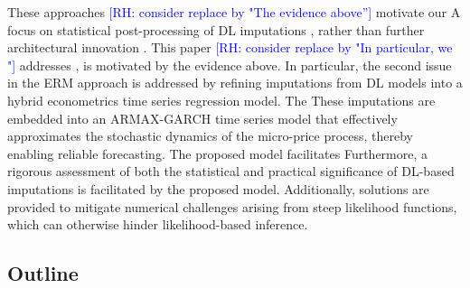 \documentclass[10pt,a4paper,oneside]{article}
\newcommand{\rh}[1]{\textcolor{blue}{\textsf{[RH: #1]}}}
\providecommand{\DIFaddtex}[1]{{\protect\color{blue} \sf #1}} %
\providecommand{\DIFdeltex}[1]{{\protect\color{red} \scriptsize #1}} %
\providecommand{\DIFaddbegin}{} %
\providecommand{\DIFaddend}{} %
\providecommand{\DIFdelbegin}{} %
\providecommand{\DIFdelend}{} %
\providecommand{\DIFadd}[1]{\texorpdfstring{\DIFaddtex{#1}}{#1}} %
\providecommand{\DIFdel}[1]{\texorpdfstring{\DIFdeltex{#1}}{}} %
\newcommand{\DIFscaledelfig}{0.5}
\newlength{\DIFdelgraphicswidth} %
\newlength{\DIFdelgraphicsheight} %
\newcommand{\DIFaddincludegraphics}[2][]{{\color{blue}\fbox{\DIFOincludegraphics[#1]{#2}}}} %
\newcommand{\DIFdelincludegraphics}[2][]{%
\sbox{\DIFdelgraphicsbox}{\DIFOincludegraphics[#1]{#2}}%
\settoboxwidth{\DIFdelgraphicswidth}{\DIFdelgraphicsbox} %
\settoboxtotalheight{\DIFdelgraphicsheight}{\DIFdelgraphicsbox} %
\scalebox{\DIFscaledelfig}{%
\parbox[b]{\DIFdelgraphicswidth}{\usebox{\DIFdelgraphicsbox}\\[-\baselineskip] \rule{\DIFdelgraphicswidth}{0em}}\llap{\resizebox{\DIFdelgraphicswidth}{\DIFdelgraphicsheight}{%
\setlength{\unitlength}{\DIFdelgraphicswidth}%
\begin{picture}(1,1)%
\thicklines\linethickness{2pt} %
{\color[rgb]{1,0,0}\put(0,0){\framebox(1,1){}}}%
{\color[rgb]{1,0,0}\put(0,0){\line( 1,1){1}}}%
{\color[rgb]{1,0,0}\put(0,1){\line(1,-1){1}}}%
\end{picture}%
}\hspace*{3pt}}} %
} %
\DeclareRobustCommand{\DIFaddbegin}{\DIFOaddbegin \let\includegraphics\DIFaddincludegraphics} %
\DeclareRobustCommand{\DIFaddend}{\DIFOaddend \let\includegraphics\DIFOincludegraphics} %
\DeclareRobustCommand{\DIFdelbegin}{\DIFOdelbegin \let\includegraphics\DIFdelincludegraphics} %
\DeclareRobustCommand{\DIFdelend}{\DIFOaddend \let\includegraphics\DIFOincludegraphics} %
\begin{document}
\DIFdelbegin \DIFdel{These approaches \rh{consider replace by "The evidence above''} motivate our }\DIFdelend \DIFaddbegin \DIFadd{A }\DIFaddend focus on statistical post-processing of DL imputations\DIFaddbegin \DIFadd{, }\DIFaddend rather than further architectural innovation\DIFdelbegin \DIFdel{. This paper \rh{consider replace by "In particular, we "} addresses }\DIFdelend \DIFaddbegin \DIFadd{, is motivated by the evidence above. In particular, }\DIFaddend the second issue in the ERM approach \DIFaddbegin \DIFadd{is addressed }\DIFaddend by refining imputations from DL models into a hybrid econometrics time series regression model. \DIFdelbegin \DIFdel{The }\DIFdelend \DIFaddbegin \DIFadd{These }\DIFaddend imputations are embedded into an ARMAX-GARCH time series model that effectively approximates the stochastic dynamics of the micro-price process, thereby enabling reliable forecasting. \DIFdelbegin \DIFdel{The proposed model facilitates }\DIFdelend \DIFaddbegin \DIFadd{Furthermore, }\DIFaddend a rigorous assessment of both the statistical and practical significance of DL-based imputations \DIFaddbegin \DIFadd{is facilitated by the proposed model}\DIFaddend . Additionally, solutions are provided to mitigate numerical challenges arising from steep likelihood functions, which can otherwise hinder likelihood-based inference.

\subsection{Outline}
\label{subsec:outline}
\end{document}
